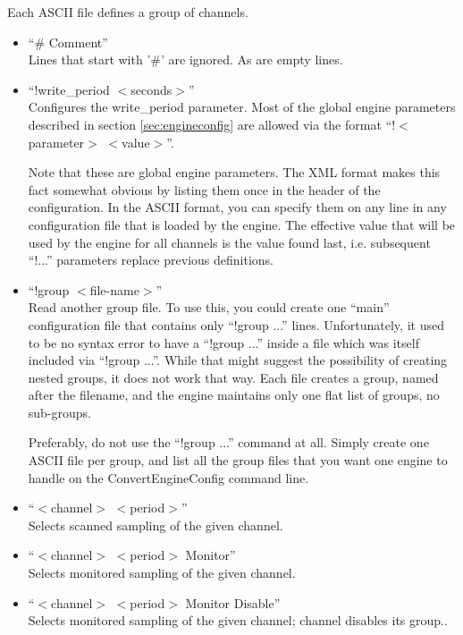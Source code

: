 Each ASCII file defines a group of channels.
\begin{itemize}
\item ``\# Comment''\\
  Lines that start with '\#' are ignored. As are empty lines.
\item ``!write\_period $<$seconds$>$''\\
  Configures the write\_period parameter. Most of the global engine
  parameters described in section \ref{sec:engineconfig} are allowed
  via the format ``!$<$parameter$>$ $<$value$>$''.

  Note that these are global engine parameters. The XML format makes
  this fact somewhat obvious by listing them once in the header of the
  configuration. In the ASCII format, you can specify them on any line
  in any configuration file that is loaded by the engine. The
  effective value that will be used by the engine for all channels is
  the value found last, i.e. subsequent ``!...''  parameters replace
  previous definitions. 
\item ``!group $<$file-name$>$''\\
  Read another group file.
  To use this, you could create one ``main'' configuration file
  that contains only ``!group ...'' lines.
  Unfortunately, it used to be no syntax error to have a ``!group
  ...'' inside a file which was itself included via ``!group ...''.
  While that might suggest the possibility of creating nested groups,
  it does not work that way. Each file creates a group, named after the
  filename, and the engine maintains only one flat list of groups,
  no sub-groups.

  Preferably, do not use the ``!group ...'' command at all.
  Simply create one ASCII file per group, and list all the group files
  that you want one engine to handle on the ConvertEngineConfig
  command line.
\item ``$<$channel$>$ $<$period$>$''\\
  Selects scanned sampling of the given channel.
\item ``$<$channel$>$ $<$period$>$ Monitor''\\
  Selects monitored sampling of the given channel.
\item ``$<$channel$>$ $<$period$>$ Monitor Disable''\\
  Selects monitored sampling of the given channel; channel disables
  its group..
\end{itemize}



